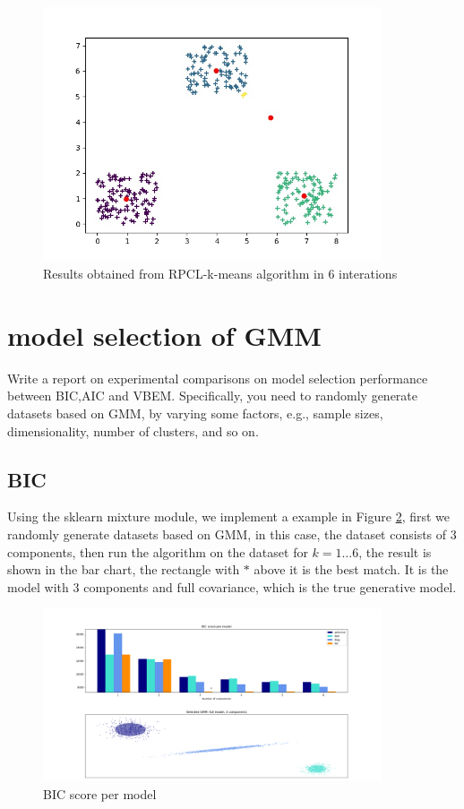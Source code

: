 \documentclass{article}
\theoremstyle{definition}
\numberwithin{equation}{section}
\numberwithin{figure}{section}
\begin{document}
\begin{figure}[htbp]
	\centering
	\includegraphics[width=10cm]{problem2/iterations/6interations.jpg}
\caption{Results obtained from RPCL-k-means algorithm in 6 interations}
\label{6times}
\end{figure}

\section{model selection of GMM}
Write a report on experimental comparisons on model selection performance between BIC,AIC and
VBEM. Specifically, you need to randomly generate datasets based on GMM, by varying some factors, e.g.,
sample sizes, dimensionality, number of clusters, and so on.
\subsection{BIC}
Using the sklearn mixture module, we implement a example in Figure \ref{BIC}, first we
 randomly generate datasets based on GMM, in this case, the dataset consists of 3 components, then run the algorithm on the dataset for $k=1\dots 6$, the result is shown in the bar chart, the rectangle with $*$ above it is the best match. It is the model with 3 components and full covariance, which is the true generative model.
\begin{figure}[htbp]
	\centering
	\includegraphics[width=10cm]{problem3/BIC.png}
\caption{BIC score per model}
\label{BIC}
\end{figure}
\end{document}
